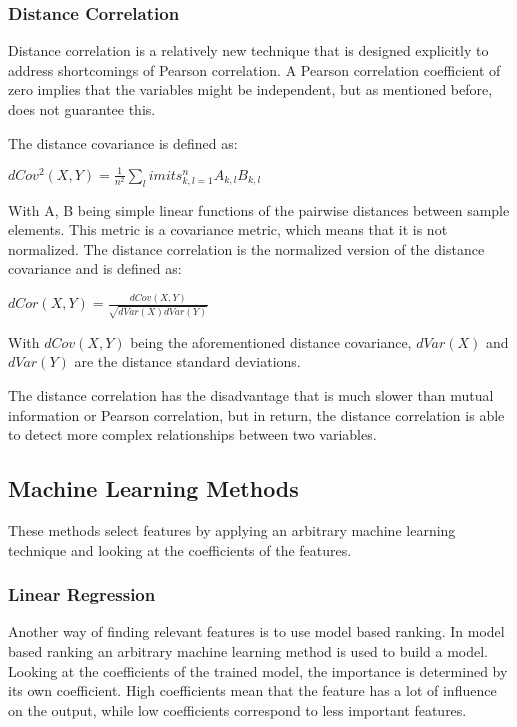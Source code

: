 \subsubsection{Distance Correlation}
Distance correlation is a relatively new technique that is designed explicitly to address shortcomings of Pearson correlation. A Pearson correlation coefficient of zero implies that the variables might be independent, but as mentioned before, does not guarantee this. 

\npar

The distance covariance is defined as\citep{distPaper}:
\begin{center}
$dCov^2(X,Y) = \frac{1}{n^2}\sum_limits_{k,l=1}^{n} A_{k,l}B_{k,l}$
\end{center}
With A, B being simple linear functions of the pairwise distances between sample elements. This metric is a covariance metric, which means that it is not normalized. The distance correlation is the normalized version of the distance covariance and is defined as:

\begin{center}
$dCor(X,Y) = \frac{dCov(X,Y)}{\sqrt{dVar(X)dVar(Y)}}$
\end{center}
With $dCov(X,Y)$ being the aforementioned distance covariance, $dVar(X)$ and $dVar(Y)$ are the distance standard deviations. 

\npar

The distance correlation has the disadvantage that is much slower than mutual information or Pearson correlation, but in return, the distance correlation is able to detect more complex relationships between two variables.

\subsection{Machine Learning Methods}
These methods select features by applying an arbitrary machine learning technique and looking at the coefficients of the features. 

\subsubsection{Linear Regression}
Another way of finding relevant features is to use model based ranking. In model based ranking an arbitrary machine learning method is used to build a model. Looking at the coefficients of the trained model, the importance is determined by its own coefficient. High coefficients mean that the feature has a lot of influence on the output, while low coefficients correspond to less important features.

